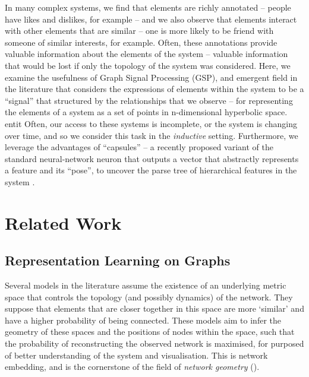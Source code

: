 \documentclass{IEEEtran}
\begin{document}
	In many complex systems, we find that elements are richly annotated -- people have likes and dislikes, for example -- and we also observe that elements interact with other elements that are similar -- one is more likely to be friend with someone of similar interests, for example.
	Often, these annotations provide valuable information about the elements of the system -- valuable information that would be lost if only the topology of the system was considered. 
	Here, we examine the usefulness of Graph Signal Processing (GSP), and emergent field in the literature that considers the expressions of elements within the system to be a ``signal'' that structured by the relationships that we observe \cite{defferrard2016convolutional,kipf2016semi,hamilton2017inductive} -- for representing the elements of a system as a set of points in n-dimensional hyperbolic space. entit
	Often, our access to these systems is incomplete, or the system is changing over time, and so we consider this task in the \textit{inductive} setting.
	Furthermore, we leverage the advantages of ``capsules'' -- a recently proposed variant of the standard neural-network neuron that outputs a vector that abstractly represents a feature and its ``pose'', to uncover the parse tree of hierarchical features in the system \cite{hinton2011transforming,sabour2017dynamic}.
	
	
	
	
	\section{Related Work}
	
		
	\subsection{Representation Learning on Graphs}
	Several models in the literature assume the existence of an underlying metric space that controls the topology (and possibly dynamics) of the network. They suppose that elements that are closer together in this space are more `similar' and have a higher probability of being connected. These models aim to infer the geometry of these spaces and the positions of nodes within the space, such that the probability of reconstructing the observed network is maximised, for purposed of better understanding of the system and visualisation. This is network embedding, and is the cornerstone of the field of \textit{network geometry} (\cite{krioukov2010hyperbolic}). 
	
\end{document}
